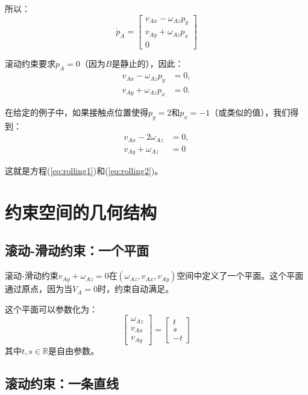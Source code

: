 \documentclass[12pt,a4paper]{article}
\begin{document}
所以：
\begin{equation}
\dot{p}_A = \begin{bmatrix} v_{Ax} - \omega_{Az} p_y \\ v_{Ay} + \omega_{Az} p_x \\ 0 \end{bmatrix}
\end{equation}

滚动约束要求$\dot{p}_A = 0$（因为$B$是静止的），因此：
\begin{align}
v_{Ax} - \omega_{Az} p_y &= 0, \label{eq:rolling_p1} \\
v_{Ay} + \omega_{Az} p_x &= 0. \label{eq:rolling_p2}
\end{align}

在给定的例子中，如果接触点位置使得$p_y = 2$和$p_x = -1$（或类似的值），我们得到：
\begin{align}
v_{Ax} - 2\omega_{Az} &= 0, \\
v_{Ay} + \omega_{Az} &= 0
\end{align}

这就是方程(\ref{eq:rolling1})和(\ref{eq:rolling2})。

\section{约束空间的几何结构}

\subsection{滚动-滑动约束：一个平面}

滚动-滑动约束$v_{Ay} + \omega_{Az} = 0$在$(\omega_{Az}, v_{Ax}, v_{Ay})$空间中定义了一个平面。这个平面通过原点，因为当$V_A = 0$时，约束自动满足。

这个平面可以参数化为：
\begin{equation}
\begin{bmatrix} \omega_{Az} \\ v_{Ax} \\ v_{Ay} \end{bmatrix} = \begin{bmatrix} t \\ s \\ -t \end{bmatrix}
\end{equation}
其中$t, s \in \mathbb{R}$是自由参数。

\subsection{滚动约束：一条直线}
\end{document}

